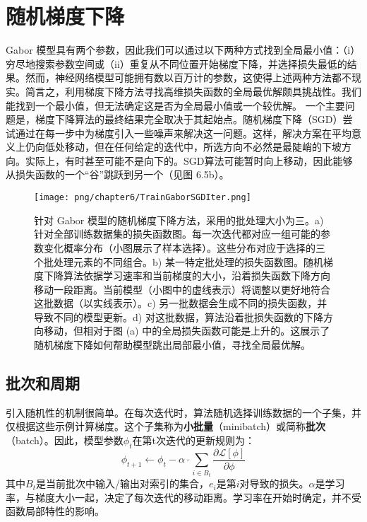 \section{随机梯度下降}
Gabor 模型具有两个参数，因此我们可以通过以下两种方式找到全局最小值：（i）穷尽地搜索参数空间或（ii）重复从不同位置开始梯度下降，并选择损失最低的结果。然而，神经网络模型可能拥有数以百万计的参数，这使得上述两种方法都不现实。简言之，利用梯度下降方法寻找高维损失函数的全局最优解颇具挑战性。我们能找到一个最小值，但无法确定这是否为全局最小值或一个较优解。
一个主要问题是，梯度下降算法的最终结果完全取决于其起始点。随机梯度下降（SGD）尝试通过在每一步中为梯度引入一些噪声来解决这一问题。这样，解决方案在平均意义上仍向低处移动，但在任何给定的迭代中，所选方向不必然是最陡峭的下坡方向。实际上，有时甚至可能不是向下的。SGD算法可能暂时向上移动，因此能够从损失函数的一个“谷”跳跃到另一个（见图 6.5b）。

\begin{figure}[ht!]
\centering
\texttt{[image: png/chapter6/TrainGaborSGDIter.png]}
\caption{针对 Gabor 模型的随机梯度下降方法，采用的批处理大小为三。a) 针对全部训练数据集的损失函数图。每一次迭代都对应一组可能的参数变化概率分布（小图展示了样本选择）。这些分布对应于选择的三个批处理元素的不同组合。b) 某一特定批处理的损失函数图。随机梯度下降算法依据学习速率和当前梯度的大小，沿着损失函数下降方向移动一段距离。当前模型（小图中的虚线表示）将调整以更好地符合这批数据（以实线表示）。c) 另一批数据会生成不同的损失函数，并导致不同的模型更新。d) 对这批数据，算法沿着批损失函数的下降方向移动，但相对于图 (a) 中的全局损失函数可能是上升的。这展示了随机梯度下降如何帮助模型跳出局部最小值，寻找全局最优解。}
\end{figure}

\subsection{批次和周期}
引入随机性的机制很简单。在每次迭代时，算法随机选择训练数据的一个子集，并仅根据这些示例计算梯度。这个子集称为\textbf{小批量}（minibatch）或简称\textbf{批次}（batch）。因此，模型参数\(\phi_t\)在第t次迭代的更新规则为：
\begin{equation}
\phi_{t+1} \leftarrow \phi_t - \alpha \cdot \sum_{i \in B_t} \frac{\partial \mathcal{L}[\phi]}{\partial \phi} 
\end{equation}
其中\(B_t\)是当前批次中输入/输出对索引的集合，\(e_i\)是第\(i\)对导致的损失。\(\alpha\)是学习率，与梯度大小一起，决定了每次迭代的移动距离。学习率在开始时确定，并不受函数局部特性的影响。

